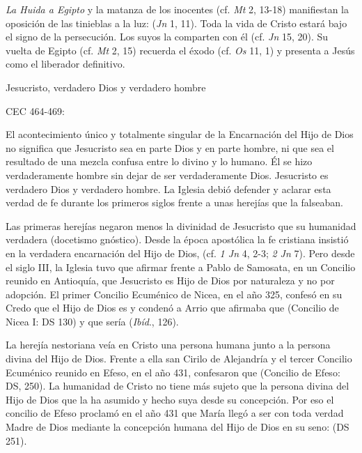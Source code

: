 	 \emph{La Huida a Egipto} y la matanza de los inocentes (cf. \emph{Mt} 2, 13-18) manifiestan la oposición de las tinieblas a la luz:  (\emph{Jn} 1, 11). Toda la vida de Cristo estará bajo el signo de la persecución. Los suyos la comparten con él (cf. \emph{Jn} 15, 20). Su vuelta de Egipto (cf. \emph{Mt} 2, 15) recuerda el éxodo (cf. \emph{Os} 11, 1) y presenta a Jesús como el liberador definitivo.
	
	Jesucristo, verdadero Dios y verdadero hombre
	
	CEC 464-469:
	
	 El acontecimiento único y totalmente singular de la Encarnación del Hijo de Dios no significa que Jesucristo sea en parte Dios y en parte hombre, ni que sea el resultado de una mezcla confusa entre lo divino y lo humano. Él se hizo verdaderamente hombre sin dejar de ser verdaderamente Dios. Jesucristo es verdadero Dios y verdadero hombre. La Iglesia debió defender y aclarar esta verdad de fe durante los primeros siglos frente a unas herejías que la falseaban.
	
	 Las primeras herejías negaron menos la divinidad de Jesucristo que su humanidad verdadera (docetismo gnóstico). Desde la época apostólica la fe cristiana insistió en la verdadera encarnación del Hijo de Dios,  (cf. \emph{1 Jn} 4, 2-3; \emph{2 Jn} 7). Pero desde el siglo III, la Iglesia tuvo que afirmar frente a Pablo de Samosata, en un Concilio reunido en Antioquía, que Jesucristo es Hijo de Dios por naturaleza y no por adopción. El primer Concilio Ecuménico de Nicea, en el año 325, confesó en su Credo que el Hijo de Dios es  y condenó a Arrio que afirmaba que  (Concilio de Nicea I: DS 130) y que sería  (\emph{Ibíd}., 126).
	
	 La herejía nestoriana veía en Cristo una persona humana junto a la persona divina del Hijo de Dios. Frente a ella san Cirilo de Alejandría y el tercer Concilio Ecuménico reunido en Efeso, en el año 431, confesaron que  (Concilio de Efeso: DS, 250). La humanidad de Cristo no tiene más sujeto que la persona divina del Hijo de Dios que la ha asumido y hecho suya desde su concepción. Por eso el concilio de Efeso proclamó en el año 431 que María llegó a ser con toda verdad Madre de Dios mediante la concepción humana del Hijo de Dios en su seno:  (DS 251).
	
